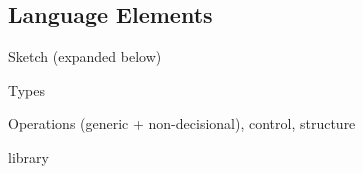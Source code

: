\subsection{Language Elements}\label{section: ola-lang-language-elements}

Sketch (expanded below)

Types

Operations (generic + non-decisional), control, structure

library